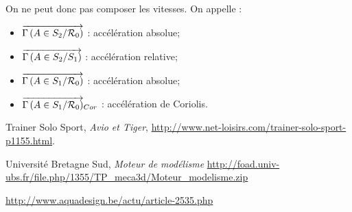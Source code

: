 \documentclass[11pt,oneside]{article}
\begin{document}
\begin{resultat}
On ne peut donc pas composer les vitesses.
On appelle : 
\begin{itemize}
\item $\overrightarrow{\Gamma \left( {A} \in {S_2}/{\mathcal{R}_0}\right)}$ : accélération absolue;
\item $\overrightarrow{\Gamma \left( {A} \in {S_2}/{S_1}\right)}$ : accélération relative;
\item $\overrightarrow{\Gamma \left( {A} \in {S_1}/{\mathcal{R}_0}\right)}$ : accélération absolue;
\item $\overrightarrow{\Gamma \left( {A} \in {S_1}/{\mathcal{R}_0}\right)}_{Cor}$ : accélération de Coriolis.
\end{itemize}
\end{resultat}

\begin{thebibliography}{2}
   Trainer Solo Sport, \textit{Avio et Tiger}, \url{http://www.net-loisirs.com/trainer-solo-sport-p1155.html}.

 Université Bretagne Sud, \textit{Moteur de modélisme} \url{http://foad.univ-ubs.fr/file.php/1355/TP_meca3d/Moteur_modelisme.zip}

 \url{http://www.aquadesign.be/actu/article-2535.php}
\end{thebibliography}
\end{document}
